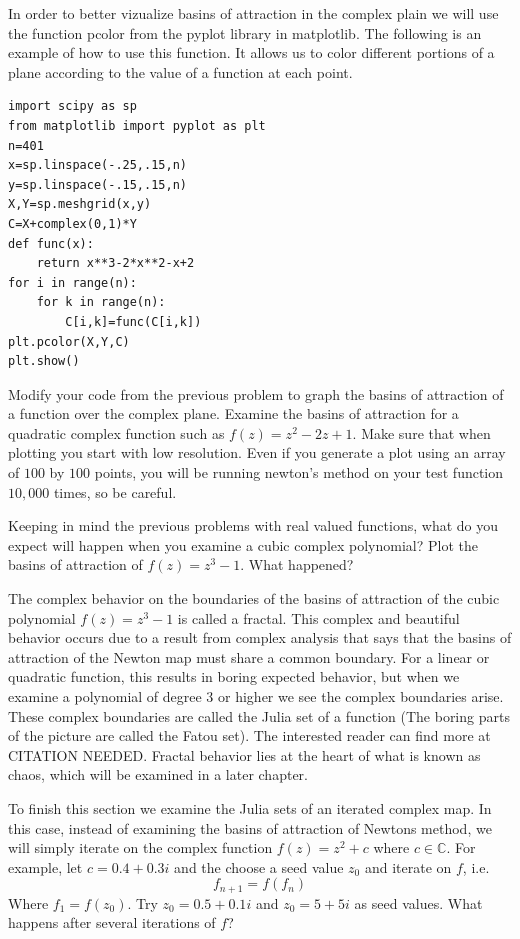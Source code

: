 
In order to better vizualize basins of attraction in the complex plain we will use the function pcolor from the pyplot library in matplotlib. The following is an example of how to use this function. It allows us to color different portions of a plane according to the value of a function at each point.

\begin{lstlisting}[style=python]
import scipy as sp
from matplotlib import pyplot as plt
n=401
x=sp.linspace(-.25,.15,n)
y=sp.linspace(-.15,.15,n)
X,Y=sp.meshgrid(x,y)
C=X+complex(0,1)*Y
def func(x):
    return x**3-2*x**2-x+2
for i in range(n):
    for k in range(n):
        C[i,k]=func(C[i,k])
plt.pcolor(X,Y,C)
plt.show()
\end{lstlisting}

\begin{problem}
Modify your code from the previous problem to graph the basins of attraction of a function over the complex plane.  Examine the basins of attraction for a quadratic complex function such as $f(z) = z^2 - 2z + 1$. Make sure that when plotting you start with low resolution. Even if you generate a plot using an array of $100$ by $100$ points, you will be running newton's method on your test function $10,000$ times, so be careful.  

Keeping in mind the previous problems with real valued functions, what do you expect will happen when you examine a cubic complex polynomial?  Plot the basins of attraction of $f(z) = z^3 - 1$.  What happened?
\end{problem}

The complex behavior on the boundaries of the basins of attraction of the cubic polynomial $f(z) = z^3 - 1$ is called a fractal.  This complex and beautiful behavior occurs due to a result from complex analysis that says that the basins of attraction of the Newton map must share a common boundary.  For a linear or quadratic function, this results in boring expected behavior, but when we examine a polynomial of degree 3 or higher we see the complex boundaries arise.  These complex boundaries are called the Julia set of a function (The boring parts of the picture are called the Fatou set).  The interested reader can find more at CITATION NEEDED. Fractal behavior lies at the heart of what is known as chaos, which will be examined in a later chapter.

To finish this section we examine the Julia sets of an iterated complex map.  In this case, instead of examining the basins of attraction of Newtons method, we will simply iterate on the complex function $f(z) = z^2 + c$ where $c \in \mathbb{C}$.  For example, let $c = 0.4 + 0.3i$ and the choose a seed value $z_0$ and iterate on $f$, i.e.
\[
f_{n+1} = f(f_n)
\]
Where $f_1 = f(z_0)$.  Try $z_0 = 0.5 + 0.1i$ and $z_0 = 5 + 5i$ as seed values.  What happens after several iterations of $f$?

